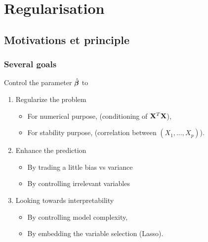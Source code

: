 \documentclass[10pt, c, xcolor=x11names]{beamer}\usepackage[]{graphicx}\usepackage[]{color}
\begin{document}
\section{Regularisation}
 

\subsection{Motivations et principle}

\begin{frame}
  \frametitle{Several goals}

  Control the parameter $\,\hat{\!\boldsymbol\beta}$ to

  \begin{enumerate}
  \item \alert{Regularize} the problem
    \begin{itemize}
    \item For numerical purpose, (conditioning of $\mathbf{X}^T\mathbf{X}$),
    \item     For    stability    purpose,     (correlation    between
      $(X_1,\dots,X_p)$).
    \end{itemize}
  \item \alert{Enhance} the prediction
    \begin{itemize}
    \item By trading a little bias vs variance
    \item By controlling irrelevant variables
    \end{itemize}
  \item \alert{Looking towards} interpretability
    \begin{itemize}
    \item By controlling model complexity,
    \item By embedding the variable selection (Lasso).
    \end{itemize}
  \end{enumerate}

\end{frame}

\end{document}
